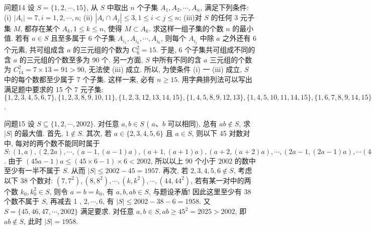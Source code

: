 问题14 设 $S=\{1,2, \cdots, 15\}$, 从 $S$ 中取出 $n$ 个子集 $A_1, A_2, \cdots, A_n$, 满足下列条件:
(i) $\left|A_i\right|=7, i=1,2, \cdots, n$;
(ii) $\left|A_i \cap A_j\right| \leqslant 3,1 \leqslant i<j \leqslant n$;
(iii)对 $S$ 的任何 3 元子集 $M$, 都存在某个 $A_k, 1 \leqslant k \leqslant n$, 使得 $M \subset A_k$. 求这样一组子集的个数 $n$ 的最小值.
若有 $a \in S$ 且至多属于 6 个子集 $A_{i_1}, A_{i_2}, \cdots, A_{i_6}$, 则每个 $A_{i_j}$ 中除 $a$ 之外还有 6 个元素, 共可组成含 $a$ 的三元组的个数为 $\mathrm{C}_6^2=15$. 于是, 6 个子集共可组成不同的含 $a$ 的三元组的个数至多为 90 个.
另一方面, $S$ 中所有不同的含 $a$ 三元组的个数为 $C_{14}^2=7 \times 13=91>90$, 无法使 (iii) 成立.
所以, 为使条件 (i) 一 (iii) 成立, $S$ 中的每个数都至少属于 7 个子集.
这样一来, 必有 $n \geqslant 15$.
用字典排列法可以写出满足题中要求的 15 个 7 元子集: $\{1,2,3,4,5, 6,7\},\{1,2,3,8,9,10,11\},\{1,2,3,12,13,14,15\},\{1,4,5,8,9, 12,13\},\{1,4,5,10,11,14,15\},\{1,6,7,8,9,14,15\},\{1,6,7,10,11,12,13\},\{2,4,6,8,10,12,14\},\{2,4,6,9,11,13,15\},\{2,5,7,8,10,13,15\},\{2,5,7,9,11,12,14\},\{3,4,7,8,11,12,15\},\{3,4,7,9,10,13,14\},\{3,5,6,8,11,13,14\},\{3,5,6,9,10,12,15\}$.



问题15 设 $S \subseteq\{1,2, \cdots, 2002\}$. 对任意 $a, b \in S$ ( $a 、 b$ 可以相同), 总有 $a b \notin S$, 求 $|S|$ 的最大值.
首先, $1 \notin S$. 其次, 若 $a \in\{2,3,4,5,6\}$ 且 $a \in S$, 则以下 45 对数对中, 每对的两个数不能同时属于 $S:(1, a),(2,2 a), \cdots,\left(a-1,(a-1) a\right),(a+1,(a+1) a),(a+2,(a+2) a), \cdots,(2 a-1,(2 a-1) a), \cdots(44 a+1, (44 a+1) a),(44 a+2,(44 a+2) a), \cdots,(45 a-1,(45 a-1) a)$. 由于 $(45 a- 1) a \leqslant(45 \times 6-1) \times 6<2002$, 所以以上 90 个小于 2002 的数中至少有一半不属于 $S$. 从而 $|S| \leqslant 2002-45=1957$.
再次, 若 $2,3,4,5,6 \notin S$, 考虑以下 38 个数对: $\left(7,7^2\right),\left(8,8^2\right), \cdots, \left(k, k^2\right), \cdots,\left(44,44^2\right)$, 若有某一对中的两个数 $k_0, k_0^2 \in S$, 则令 $a=b=k_0$, 有 $a, b, a b \in S$, 与题设矛盾! 因此这里至少有 38 个数不属于 $S$, 再减去 1 , $2, \cdots, 6$, 有 $|S| \leqslant 2002-38-6=1958$. 又 $S=\{45,46,47, \cdots, 2002\}$ 满足要求.
对任意 $a, b \in S, a b \geqslant 45^2=2025>2002$, 即 $a b \notin S$, 此时 $|S|=1958$.



